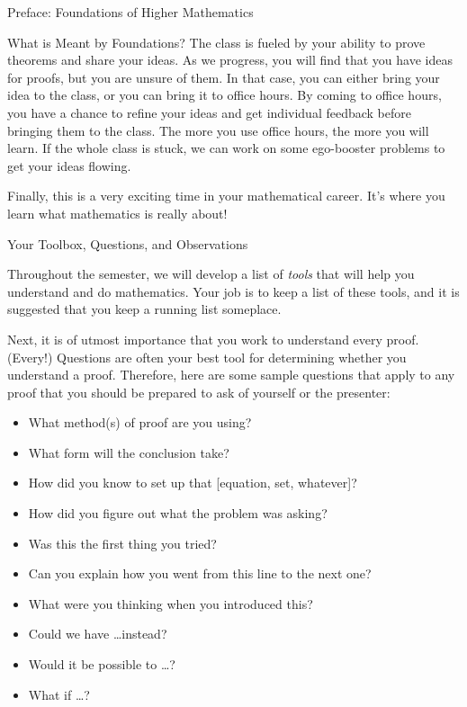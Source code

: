 \documentclass[11pt]{article}
\begin{document}
\begin{section}{Preface: Foundations of Higher Mathematics}
\begin{subsection}{What is Meant by Foundations?}
The class is fueled by your ability to prove theorems and share your ideas.  As we progress, you will find that you have ideas for proofs, but you are unsure of them.  In that case, you can either bring your idea to the class, or you can bring it to office hours.  By coming to office hours, you have a chance to refine your ideas and get individual feedback before bringing them to the class.  The more you use office hours, the more you will learn.  If the whole class is stuck, we can work on some ego-booster problems to get your ideas flowing.

Finally, this is a very exciting time in your mathematical career.  It's where you learn what mathematics is really about!

\end{subsection}

\begin{subsection}{Your Toolbox, Questions, and Observations}

Throughout the semester, we will develop a list of \emph{tools} that will help you understand and do mathematics. Your job is to keep a list of these tools, and it is suggested that you keep a running list someplace.

Next, it is of utmost importance that you work to understand every proof. (Every!)  Questions are often your best tool for determining whether you understand a proof.  Therefore, here are some sample questions that apply to any proof that you should be prepared to ask of yourself or the presenter:
\begin{itemize}
\item What method(s) of proof are you using?
\item What form will the conclusion take?
\item How did you know to set up that [equation, set, whatever]?
\item How did you figure out what the problem was asking?
\item Was this the first thing you tried?
\item Can you explain how you went from this line to the next one?
\item What were you thinking when you introduced this?
\item Could we have \ldots instead?
\item Would it be possible to \ldots?
\item What if \ldots?
\end{itemize}


\end{subsection}
\end{section}
\end{document}
